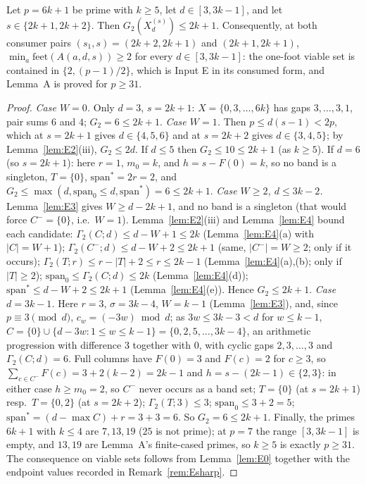 \begin{lemma}\label{lem:E}
Let $p=6k+1$ be prime with $k\ge5$, let $d\in[3,3k-1]$, and let
$s\in\{2k{+}1,2k{+}2\}$. Then $G_2(X^{(s)}_d)\le2k+1$. Consequently, at
both consumer pairs $(s_1,s)=(2k{+}2,2k{+}1)$ and $(2k{+}1,2k{+}1)$,
$\min_a\mathrm{feet}(A(a,d,s))\ge2$ for every $d\in[3,3k-1]$: the
one-foot viable set is contained in $\{2,(p-1)/2\}$, which is Input E
in its consumed form, and Lemma~A is proved for $p\ge31$.
\end{lemma}

\begin{proof}
\emph{Case $W=0$.} Only $d=3$, $s=2k{+}1$: $X=\{0,3,\dots,6k\}$ has
gaps $3,\dots,3,1$, pair sums $6$ and $4$; $G_2=6\le2k+1$.
\emph{Case $W=1$.} Then $p\le d(s-1)<2p$, which at $s=2k{+}1$ gives
$d\in\{4,5,6\}$ and at $s=2k{+}2$ gives $d\in\{3,4,5\}$; by
Lemma~\ref{lem:E2}(iii), $G_2\le2d$. If $d\le5$ then
$G_2\le10\le2k+1$ (as $k\ge5$). If $d=6$ (so $s=2k{+}1$): here $r=1$,
$m_0=k$, and $h=s-F(0)=k$, so no band is a singleton, $T=\{0\}$,
$\mathrm{span}^\ast=2r=2$, and $G_2\le\max(d,\mathrm{span}_0\le d,
\mathrm{span}^\ast)=6\le2k+1$.
\emph{Case $W\ge2$, $d\le3k-2$.} Lemma~\ref{lem:E3} gives
$W\ge d-2k+1$, and no band is a singleton (that would force
$C^-=\{0\}$, i.e.\ $W=1$). Lemma~\ref{lem:E2}(iii) and
Lemma~\ref{lem:E4} bound each candidate:
$\Gamma_2(C;d)\le d-W+1\le2k$ (Lemma~\ref{lem:E4}(a) with $|C|=W+1$);
$\Gamma_2(C^-;d)\le d-W+2\le2k+1$ (same, $|C^-|=W\ge2$; only if it
occurs); $\Gamma_2(T;r)\le r-|T|+2\le r\le2k-1$
(Lemma~\ref{lem:E4}(a),(b); only if $|T|\ge2$);
$\mathrm{span}_0\le\Gamma_2(C;d)\le2k$ (Lemma~\ref{lem:E4}(d));
$\mathrm{span}^\ast\le d-W+2\le2k+1$ (Lemma~\ref{lem:E4}(e)). Hence
$G_2\le2k+1$.
\emph{Case $d=3k-1$.} Here $r=3$, $\sigma=3k-4$, $W=k-1$
(Lemma~\ref{lem:E3}), and, since $p\equiv3\pmod d$,
$c_w=(-3w)\bmod d$; as $3w\le3k-3<d$ for $w\le k-1$,
$C=\{0\}\cup\{d-3w:1\le w\le k-1\}=\{0,2,5,\dots,3k-4\}$, an
arithmetic progression with difference $3$ together with $0$, with
cyclic gaps $2,3,\dots,3$ and $\Gamma_2(C;d)=6$. Full columns have
$F(0)=3$ and $F(c)=2$ for $c\ge3$, so
$\sum_{c\in C^-}F(c)=3+2(k-2)=2k-1$ and $h=s-(2k-1)\in\{2,3\}$: in
either case $h\ge m_0=2$, so $C^-$ never occurs as a band set;
$T=\{0\}$ (at $s=2k{+}1$) resp.\ $T=\{0,2\}$ (at $s=2k{+}2$);
$\Gamma_2(T;3)\le3$; $\mathrm{span}_0\le3+2=5$;
$\mathrm{span}^\ast=(d-\max C)+r=3+3=6$. So $G_2=6\le2k+1$.
Finally, the primes $6k+1$ with $k\le4$ are $7,13,19$ ($25$ is not
prime); at $p=7$ the range $[3,3k-1]$ is empty, and $13,19$ are
Lemma~A's finite-cased primes, so $k\ge5$ is exactly $p\ge31$. The
consequence on viable sets follows from Lemma~\ref{lem:E0} together
with the endpoint values recorded in Remark~\ref{rem:Esharp}.
\end{proof}

